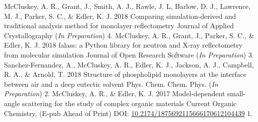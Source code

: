 \begin{cvpubys}
  \cvpuby
	{McCluskey, A. R., Grant, J., Smith, A. J., Rawle, J. L, Barlow, D. J., Lawrence, M. J., Parker, S. C., \& Edler, K. J.}
    {2018}
    {Comparing simulation-derived and traditional analysis method for monolayer reflectometry}
    {Journal of Applied Crystallography (\emph{In Preparation})}
    {4.}
  \cvpuby
    {McCluskey, A. R., Grant, J., Parker, S. C., \& Edler, K. J.}
    {2018}
    {falass: a Python library for neutron and X-ray reflectometry from molecular simulation}
    {Journal of Open Research Software (\emph{In Preparation})}
    {3.}
  \cvpuby
    {Sanchez-Fernandez, A., McCluskey, A. R., Edler, K. J., Jackson, A. J., Campbell, R. A., \& Arnold, T.}
    {2018}
    {Structure of phospholipid monolayers at the interface between air and a deep eutectic solvent}
    {Phys. Chem. Chem. Phys. (\emph{In Preparation})}
    {2.}
  \cvpuby
    {McCluskey, A. R., \& Edler, K. J.}
    {2017}
    {Model-dependent small-angle scattering for the study of complex organic materials}
    {Current Organic Chemistry, (E-pub Ahead of Print) DOI: \href{10.2174/1875692115666170612104439}{10.2174/1875692115666170612104439}}
    {1.}
\end{cvpubys}

